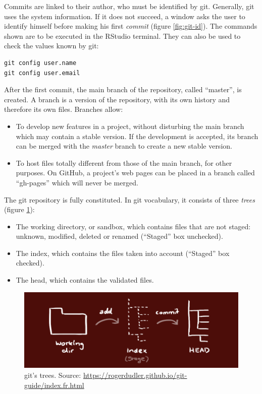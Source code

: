 \documentclass[
  12pt,
  american,
  a4paper,
  extrafontsizes,onecolumn,openright
  ]{memoir}
\providecommand{\tightlist}{%
  \setlength{\itemsep}{0pt}\setlength{\parskip}{0pt}}
\begin{document}
\normalsize

Commits are linked to their author, who must be identified by git.
Generally, git uses the system information.
If it does not succeed, a window asks the user to identify himself before making his first \emph{commit} (figure \ref{fig:git-id}).
The commands shown are to be executed in the RStudio terminal.
They can also be used to check the values known by git:

\begin{verbatim}
git config user.name
git config user.email
\end{verbatim}

After the first commit, the main branch of the repository, called \enquote{master}, is created.
A branch is a version of the repository, with its own history and therefore its own files.
Branches allow:

\begin{itemize}
\tightlist
\item
  To develop new features in a project, without disturbing the main branch which may contain a stable version.
  If the development is accepted, its branch can be merged with the \emph{master} branch to create a new stable version.
\item
  To host files totally different from those of the main branch, for other purposes.
  On GitHub, a project's web pages can be placed in a branch called \enquote{gh-pages} which will never be merged.
\end{itemize}

The git repository is fully constituted.
In git vocabulary, it consists of three \emph{trees} (figure \ref{fig:git-Trees}):

\begin{itemize}
\tightlist
\item
  The working directory, or sandbox, which contains files that are not staged: unknown, modified, deleted or renamed (\enquote{Staged} box unchecked).
\item
  The index, which contains the files taken into account (\enquote{Staged} box checked).
\item
  The head, which contains the validated files.
\end{itemize}



\scriptsize

\begin{figure}

{\centering \includegraphics[width=0.8\linewidth]{images/git-Trees} 

}

\caption{git's trees. Source: \url{https://rogerdudler.github.io/git-guide/index.fr.html}}\label{fig:git-Trees}
\end{figure}
\end{document}
